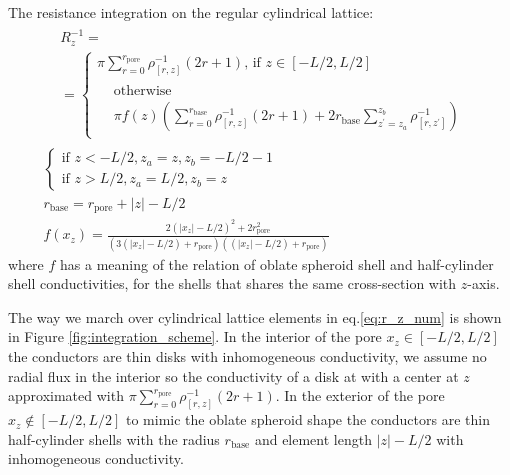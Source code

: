 \documentclass[10pt, a4paper]{article}
\begin{document}
\begin{multicols}{2}
The resistance integration on the regular cylindrical lattice:
\begin{gather}
    \label{eq:r_z_num}
    \begin{aligned} 
        &R_z^{-1} =
        \\
        &=\begin{cases}
             \pi \sum_{r=0}^{r_{\textrm{pore}}} \rho^{-1}_{[r,z]} (2r+1) \textrm{, if } z\in[-L/2,L/2]
             \\[4pt]
             \begin{aligned}
                &\textrm{otherwise}
                \\
                &\pi f(z) \left(\sum_{r=0}^{r_{\textrm{base}}} \rho^{-1}_{[r,z]} (2r+1) + 2 r_{\textrm{base}} \sum_{z^{\prime} = z_{a}}^{z_{b}}\rho^{-1}_{[r,z^{\prime}]}\right)
             \end{aligned}
        \end{cases}
    \end{aligned}
    \\
    \begin{cases}
        \textrm{if } z < -L/2, z_{a} = z, z_{b} = -L/2-1
        \\
        \textrm{if } z > L/2, z_{a} = L/2, z_{b} = z
    \end{cases}
    \\
    \label{eq:r_base}
    r_{\textrm{base}} = r_{\textrm{pore}} + |z| - L/2
    \\
    \label{eq:prefactor}
    f(x_z) = \frac{2(|x_z|-L/2)^2 + 2r_{\textrm{pore}}^2}{(3(|x_z|-L/2)+r_{\textrm{pore}})((|x_z|-L/2)+r_{\textrm{pore}})}
\end{gather}
where $f$ has a meaning of the relation of oblate spheroid shell and half-cylinder shell conductivities, for the shells that shares the same cross-section with $z$-axis.

The way we march over cylindrical lattice elements in eq.\ref{eq:r_z_num} is shown in Figure \ref{fig:integration_scheme}. 
In the interior of the pore $x_z \in [-L/2, L/2]$ the conductors are thin disks with inhomogeneous conductivity, we assume no radial flux in the interior so the conductivity of a disk at with a center at $z$ approximated with $\pi \sum_{r=0}^{r_{\textrm{pore}}} \rho^{-1}_{[r,z]} (2r+1)$.
In the exterior of the pore $x_z \notin [-L/2, L/2]$ to mimic the oblate spheroid shape the conductors are thin half-cylinder shells with the radius $r_{\textrm{base}}$ and element length $|z| - L/2$ with inhomogeneous conductivity.


\end{multicols}
\end{document}
